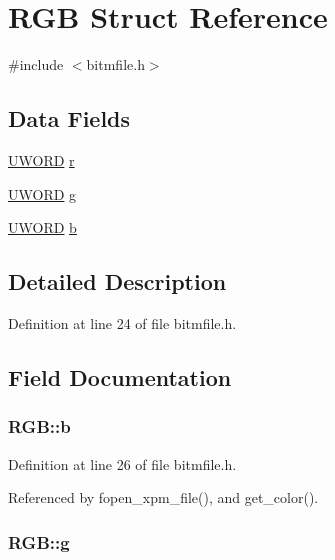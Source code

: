 \hypertarget{structRGB}{\section{R\+G\+B Struct Reference}
\label{structRGB}
}


{\ttfamily \#include $<$bitmfile.\+h$>$}

\subsection*{Data Fields}
\begin{DoxyCompactItemize}
\item 
\hyperlink{bitmfile_8h_a0428171499a4ab7aebc2bf058ae337df}{U\+W\+O\+R\+D} \hyperlink{structRGB_a6eac0c096c68d7367b091228f15ba61c}{r}
\item 
\hyperlink{bitmfile_8h_a0428171499a4ab7aebc2bf058ae337df}{U\+W\+O\+R\+D} \hyperlink{structRGB_a012d05dd3c39172027362cd9582d62f4}{g}
\item 
\hyperlink{bitmfile_8h_a0428171499a4ab7aebc2bf058ae337df}{U\+W\+O\+R\+D} \hyperlink{structRGB_adc33eddd7bf2ca2370f551dfd2f4456e}{b}
\end{DoxyCompactItemize}


\subsection{Detailed Description}


Definition at line 24 of file bitmfile.\+h.



\subsection{Field Documentation}
\hypertarget{structRGB_adc33eddd7bf2ca2370f551dfd2f4456e}{
\subsubsection[{b}]{ R\+G\+B\+::b}}\label{structRGB_adc33eddd7bf2ca2370f551dfd2f4456e}


Definition at line 26 of file bitmfile.\+h.



Referenced by fopen\+\_\+xpm\+\_\+file(), and get\+\_\+color().

\hypertarget{structRGB_a012d05dd3c39172027362cd9582d62f4}{
\subsubsection[{g}]{ R\+G\+B\+::g}}\label{structRGB_a012d05dd3c39172027362cd9582d62f4}


